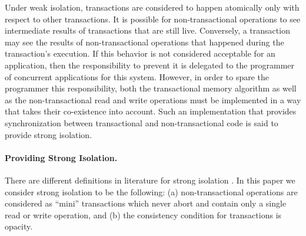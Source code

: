 Under weak isolation, transactions are considered to  
happen atomically only  with respect to other transactions.  It is possible
for non-transactional operations to see intermediate results  
of transactions that are still  live. Conversely, a transaction may see the
results of non-transactional operations that happened during  
the  transaction{}'s   execution.  If  this  behavior   is  not  considered
acceptable for an application, then the responsibility to prevent it is  
delegated   to  the   programmer  of   concurrent  applications   for  this
system. However, in order to spare the programmer this responsibility,  
both the  transactional memory algorithm  as well as  the non-transactional
read and write operations must be implemented in a way  
that  takes their co-existence  into account.  Such an  implementation that
provides synchronization  between transactional and  non-transactional code
is said to provide strong isolation.  


\paragraph{Providing Strong Isolation.}

There  are different  definitions in  literature for  strong 
isolation \cite{blundell06,ma07,harris06}.
In this paper we consider strong isolation to be the following:
(a) non-transactional   operations   are   considered  as ``mini''
transactions which never abort and  contain only a single  read or 
write operation, and (b) the consistency condition for transactions is opacity.
 
